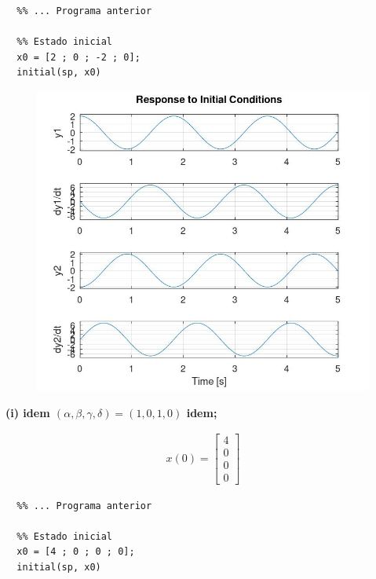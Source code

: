 \documentclass[11pt]{article}
\begin{document}
\begin{verbatim}
  %% ... Programa anterior

  %% Estado inicial
  x0 = [2 ; 0 ; -2 ; 0];
  initial(sp, x0)
\end{verbatim}

\begin{center}
  \begin{figure}[h]
    \centering
    \includegraphics[scale=0.5]{plot2h.jpg}
  \end{figure}
\end{center}

\newpage

\textbf{(i) idem $(\alpha, \beta, \gamma, \delta) = (1, 0, 1, 0)$ idem;}

\begin{align*}
  x(0) =
  \begin{bmatrix}
    4 \\
    0\\
    0\\
    0
  \end{bmatrix}
\end{align*}

\begin{verbatim}
  %% ... Programa anterior

  %% Estado inicial
  x0 = [4 ; 0 ; 0 ; 0];
  initial(sp, x0)
\end{verbatim}
\end{document}
